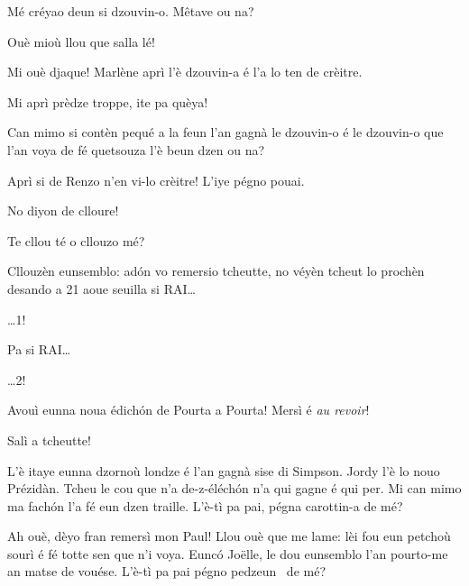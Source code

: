 \begin{drama}
\Brunospeaks Mé créyao deun si dzouvin-o. M\^etave ou na?

\Noteospeaks Ouè mioù llou que salla lé!

\Brunospeaks Mi ouè djaque! Marlène aprì l'è dzouvin-a é l'a lo ten de crèitre.

\Noteospeaks Mi aprì prèdze troppe, ite pa quèya!

\Brunospeaks Can mimo si contèn pequé a la feun l'an gagnà le dzou\-vin-o é le dzouvin-o que l'an voya de fé quetsouza l'è beun dzen ou na?

\Noteospeaks  Aprì si de Renzo n'en vi-lo crèitre!  L'iye pégno pouai.

\Brunospeaks No diyon de clloure!

\Noteospeaks  Te cllou té o cllouzo mé?

\Brunospeaks  Cllouzèn eunsemblo: ad\'on  vo remersio tcheut\-te, no véyèn tcheut lo prochèn desando a 21 aoue seuilla si RAI\ldots

\Noteospeaks \ldots 1!

\Brunospeaks  Pa si RAI\ldots
 
\Noteospeaks \ldots 2!
 
\Brunospeaks Avouì eunna noua édich\'on de Pourta a Pourta! Mersì é \textit{au revoir}!
 
\Noteospeaks Salì a tcheutte!
 


\ridoiver


\Presidanspeaks {} L'è itaye eunna dzornoù londze é l'an gagnà sise di Simpson. Jordy l’è lo nouo Prézidàn. Tcheu le cou que n’a de-z-éléch\'on n’a qui gagne é qui per. Mi can mimo ma fach\'on l’a fé eun dzen traille. L'è-tì pa pai, pégna carottin-a \carota de mé?


\Presidanspeaks Ah ouè, dèyo fran remersì mon Paul! Llou ouè que me lame: lèi fou eun petchoù sourì é fé totte sen que n'i voya. Eunc\'o Jo\"{e}lle, le dou eunsemblo l'an pourto-me an matse de vouése. L’è-tì pa pai pégno pedzeun \pulcino\ de mé?


\end{drama}
